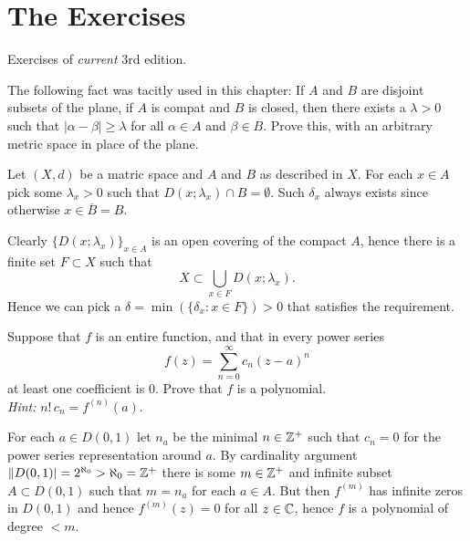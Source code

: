 \section{The Exercises} %

Exercises of \emph{current} 3rd edition.

\begin{enumerate}

\begin{excopy}
The following fact was tacitly used in this chapter:
If $A$ and $B$ are disjoint subsets of the plane,
if $A$ is compat and $B$ is closed, then there exists a \(\lambda > 0\)
such that \(|\alpha - \beta| \geq \lambda\) for all
\(\alpha \in A\) and \(\beta \in B\).
Prove this, with an arbitrary metric space in place of the plane.
\end{excopy}

Let \((X,d)\) be a matric space and $A$ and $B$ as described in $X$.
For each \(x\in A\) pick some \(\lambda_x>0\) such that
\(D(x;\lambda_x) \cap B = \emptyset\). Such \(\delta_x\) always exists
since otherwise \(x \in \overline{B}=B\).

Clearly \(\{D(x;\lambda_x)\}_{x\in A}\) is an open covering of the compact $A$,
hence there is a finite set \(F\subset X\) such that
\begin{equation*}
 X \subset \bigcup_{x\in F} D(x;\lambda_x).
\end{equation*}
Hence we can pick a \(\delta = \min(\{\delta_x: x\in F\}) > 0\)
that satisfies the requirement.


\begin{excopy}
Suppose that $f$ is an entire function,
and that in every  power series
\begin{equation*}
f(z) = \sum_{n=0}^\infty c_n(z-a)^n
\end{equation*}
at least one coefficient is $0$. Prove that $f$ is a polynomial.
\\ \emph{Hint:} \(n!\,c_n = f^{(n)}(a)\).
\end{excopy}

For each \(a\in D(0,1)\) let \(n_a\) be the minimal \(n\in\mathbb{Z}^+\) such that
\(c_n=0\) for the power series representation around $a$.
By cardinality argument \(\|D(0,1)|=2^{\aleph_0} > \aleph_0 = \mathbb{Z}^+\)
there is some \(m\in\mathbb{Z}^+\) and infinite subset \(A\subset D(0,1)\)
such that \(m=n_a\) for each \(a\in A\).
But then \(f^{(m)}\) has infinite zeros in \(D(0,1)\)
and hence \(f^{(m)}(z) = 0\) for all \(z\in\mathbb{C}\),
hence $f$ is a polynomial of degree  \(<m\).


\end{enumerate}
